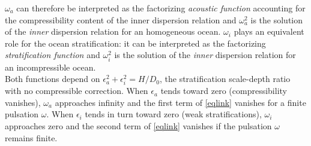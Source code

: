 \documentclass[a4paper,11pt]{article}
\begin{document}
$\omega_a$ can therefore be interpreted as the factorizing \textit{acoustic function} accounting for the compressibility content of the inner dispersion relation and $\omega_a^2$ is the solution of the \textit{inner} dispersion relation for an homogeneous ocean. $\omega_i$ plays an equivalent role for the ocean stratification: it can be interpreted as the factorizing \textit{stratification function} and $\omega_i^2$ is the solution of the \textit{inner} dispersion relation for an incompressible ocean.\\
Both functions depend on $\epsilon_a^2+\epsilon_i^2 = H/D_0$, the stratification scale-depth ratio with no compressible correction. 
When $\epsilon_a$ tends toward zero (compressibility vanishes), $\omega_a$ approaches infinity and the first term of \ref{eqlink} vanishes for a finite pulsation $\omega$. 
When $\epsilon_i$ tends in turn toward zero (weak stratifications), $\omega_i$ approaches zero and the second term of \ref{eqlink} vanishes if the pulsation $\omega$ remains finite. 
\end{document}
